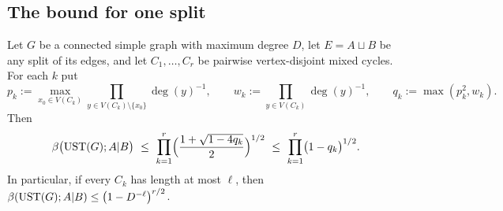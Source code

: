 \subsection{The bound for one split}

\begin{theorem}\label{thm:cut}
Let $G$ be a connected simple graph with maximum degree $D$, let $E=A\sqcup B$ be any split of its edges, and let $C_1,\dots,C_r$ be pairwise vertex-disjoint mixed cycles. For each $k$ put
\[
  p_k:=\max_{x_0\in V(C_k)}\prod_{y\in V(C_k)\setminus\{x_0\}}\deg(y)^{-1},\qquad w_k:=\prod_{y\in V(C_k)}\deg(y)^{-1},\qquad q_k:=\max(p_k^2,w_k).
\]
Then
\[
  \beta\bigl(\UST(G);A|B\bigr)\ \le\ \prod_{k=1}^r\Bigl(\frac{1+\sqrt{1-4q_k}}2\Bigr)^{1/2}\ \le\ \prod_{k=1}^r\bigl(1-q_k\bigr)^{1/2}.
\]
In particular, if every $C_k$ has length at most $\ell$, then $\beta(\mathrm{UST}(G);A|B)\le\bigl(1-D^{-\ell}\bigr)^{r/2}$.
\end{theorem}

